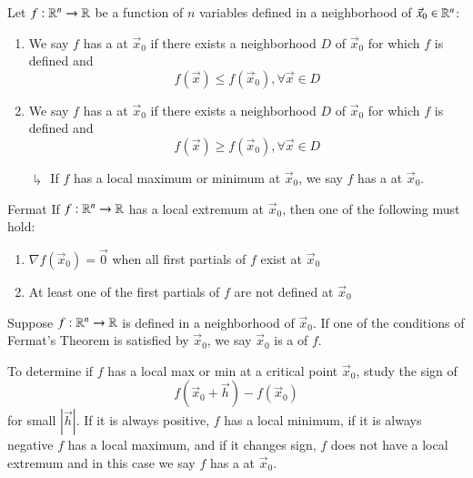 \documentclass[12pt]{report}
\begin{document}
\begin{appendices}
    \begin{defn}{}{}
        Let $f:\mathbb R^n\rightarrow \mathbb R$ be a function of $n$ variables defined in a neighborhood of $\vec{x}_0 \in \mathbb R^n$: \begin{enumerate}
            \item We say $f$ has a  at $\vec{x}_0$ if there exists a neighborhood $D$ of $\vec{x}_0$ for which $f$ is defined and \begin{equation}
                f(\vec{x}) \leq f(\vec{x}_0), \forall \vec{x} \in D
            \end{equation}
            \item We say $f$ has a  at $\vec{x}_0$ if there exists a neighborhood $D$ of $\vec{x}_0$ for which $f$ is defined and \begin{equation}
                f(\vec{x}) \geq f(\vec{x}_0), \forall \vec{x} \in D
            \end{equation}
            \item[$\drsh$] If $f$ has a local maximum or minimum at $\vec{x}_0$, we say $f$ has a  at $\vec{x}_0$.
        \end{enumerate}
    \end{defn}
    
    \begin{thm}{Fermat}{}
        If $f:\mathbb R^n\rightarrow \mathbb R$ has a local extremum at $\vec{x}_0$, then one of the following must hold:\begin{enumerate}
            \item $\nabla f(\vec{x}_0) = \vec{0}$ when all first partials of $f$ exist at $\vec{x}_0$
            \item At least one of the first partials of $f$ are not defined at $\vec{x}_0$
        \end{enumerate}
    \end{thm}
    
    \begin{defn}{}{}
        Suppose $f:\mathbb R^n\rightarrow \mathbb R$ is defined in a neighborhood of $\vec{x}_0$. If one of the conditions of Fermat's Theorem is satisfied by $\vec{x}_0$, we say $\vec{x}_0$ is a  of $f$.
    \end{defn}
    
    \begin{rmk}{}{}
        To determine if $f$ has a local max or min at a critical point $\vec{x}_0$, study the sign of \begin{equation}
            f(\vec{x}_0 + \vec{h}) - f(\vec{x}_0)
        \end{equation}
        for small $|\vec{h}|$. If it is always positive, $f$ has a local minimum, if it is always negative $f$ has a local maximum, and if it changes sign, $f$ does not have a local extremum and in this case we say $f$ has a  at $\vec{x}_0$.
    \end{rmk}
    

\end{appendices}
\end{document}
